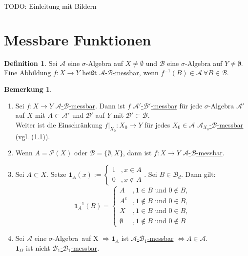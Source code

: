 \documentclass[a4paper]{scrreprt}
\newcommand{\PowerSet}{\mathcal{P}}
\newcommand{\doubleOne}{\textbf{1}}
\newcommand{\Borel}{\mathcal{B}}
\newcommand{\Bd}{\Borel_d}
\newcommand{\jlabel}[1]{\label{j_#1}}
\newcommand{\jhyperref}[2]{\hyperref[j_#1]{#2}}
\newcommand{\jlink}[1]{\jhyperref{#1}{#1}}
\newcommand{\mb}[2]{\jhyperref{messbar}{#1-#2-messbar}}
\newcommand{\calMb}[2]{\mb{$\mathcal{#1}$}{$\mathcal{#2}$}}
\newcommand{\jabb}[3]{ #1: #2 \rightarrow #3 }
\newcommand{\jsigalg}{$\sigma$-Algebra}
\theoremstyle{plain}
\theoremstyle{definition}
\newtheorem{defn}[thm]{Definition}
\newtheorem{bem}[thm]{Bemerkung}
\begin{document}
{{{    TODO: Einleitung mit Bildern

\section{Messbare Funktionen}

\begin{defn}
\jlabel{Def 2.1}
\jlabel{messbar}
    Sei $\mathcal{A}$ eine $\sigma$-Algebra auf $X\ne\emptyset$ und $\Borel$ eine $\sigma$-Algebra auf $Y\ne \emptyset$. Eine Abbildung $f:X \rightarrow Y$ heißt \uline{\calMb{A}{B}}, wenn $f^{-1}(B) \in \mathcal{A}\ \forall B\in \Borel$.
\end{defn}

\jlabel{Bem 2.2}
\begin{bem}
    \begin{enumerate}
        \item
            Sei $f: X \rightarrow Y$ \calMb{A}{B}. Dann ist $f$ \calMb{A'}{B'} für jede $\sigma$-Algebra $\mathcal{A}'$ auf $X$ mit $A\subset \mathcal{A'}$ und $\mathcal{B'}$ auf $Y$ mit $\mathcal{B'} \subset \Borel$.\\
            Weiter ist die Einschränkung $\jabb{f|_{X_0}}{X_0}{Y}$ für jedes $X_0 \in \mathcal{A}$ \mb{$\mathcal{A}_{X_0}$}{$\Borel$} (vgl. \jlink{(1.1)}).
            
        \item Wenn $A = \PowerSet(X)$ oder $\Borel = \{\emptyset, X\}$, dann ist $\jabb{f}{X}{Y}$ \calMb{A}{B}.
        \item Sei $A\subset X$. Setze $\doubleOne_A(x) := \begin{cases} 1 &, x\in A \\ 0 &, x \notin A \end{cases}$. Sei $B \in \Bd$. Dann gilt:
        \begin{displaymath}
            \doubleOne_A^{-1}(B) = 
            \begin{cases}
                A &, 1 \in B \text{ und } 0 \notin B, \\
                A^c &, 1 \notin B \text{ und } 0 \in B, \\
                X &, 1 \in B \text{ und } 0 \in B, \\
                \emptyset &, 1 \notin B \text{ und } 0 \notin B
            \end{cases}
        \end{displaymath}
        \item Sei $\mathcal{A}$ eine \jsigalg \ auf X $\Rightarrow \doubleOne_A$ ist \mb{$\mathcal{A}$}{$\Borel_1$} $\Leftrightarrow A \in \mathcal{A}$.\\
        $\doubleOne_{\Omega}$ ist nicht \mb{$\Borel_1$}{$\Borel_1$}.
        

\end{enumerate}
\end{bem}}}}
\end{document}
